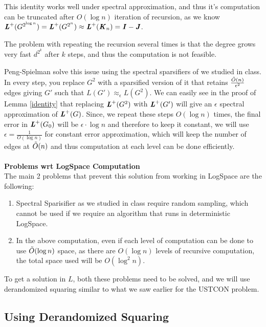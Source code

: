 \documentclass{article}
\begin{document}
This identity works well under spectral approximation, and thus it's computation can be truncated after $O(\log n)$ iteration of recursion, as we know $\boldsymbol{\mathit{L}}^+(G^{2^{\log n}})=\boldsymbol{\mathit{L}}^+(G^{2^n})\approx\boldsymbol{\mathit{L}}^+(\boldsymbol{\mathit{K}}_n)=\boldsymbol{\mathit{I}}-\boldsymbol{\mathit{J}}$.

The problem with repeating the recursion several times is that the degree grows very fast $d^{2^k}$ after $k$ steps, and thus the computation is not feasible.

Peng-Spielman solve this issue using the spectral sparsifiers of \cite{spielman2011spectral} we studied in class. In every step, you replace $G^2$ with a sparsified version of it that retains $\frac{\Tilde{O}(n)}{\epsilon^2}$ edges giving $G'$ such that $L(G')\approx_{\epsilon} L(G^2)$. We can easily see in the proof of Lemma \ref{identity} that replacing $\boldsymbol{\mathit{L}}^+(G^2)$ with $\boldsymbol{\mathit{L}}^+(G')$ will give an $\epsilon$ spectral approximation of $\boldsymbol{\mathit{L}}^+(G)$. Since, we repeat these steps $O(\log n)$ times, the final error in $\boldsymbol{\mathit{L}}^+(G_0)$ will be $\epsilon\cdot\log n$ and therefore to keep it constant, we will use $\epsilon=\frac{1}{O(\log n)}$ for constant error approximation, which will keep the number of edges at $\Tilde{O}(n)$ and thus computation at each level can be done efficiently.\\
\\

\textbf{Problems wrt LogSpace Computation}\\
The main 2 problems that prevent this solution from working in LogSpace are the following:

\begin{enumerate}
    \item Spectral Sparisifier as we studied in class require random sampling, which cannot be used if we require an algorithm that runs in deterministic LogSpace.
    \item In the above computation, even if each level of computation can be done to use $\Tilde{O}(\log n)$ space, as there are $O(\log n)$ levels of recursive computation, the total space used will be $O(\log^2 n)$.
\end{enumerate}

To get a solution in $L$, both these problems need to be solved, and we will use derandomized squaring similar to what we saw earlier for the USTCON problem.

\subsection{Using Derandomized Squaring}
\end{document}
